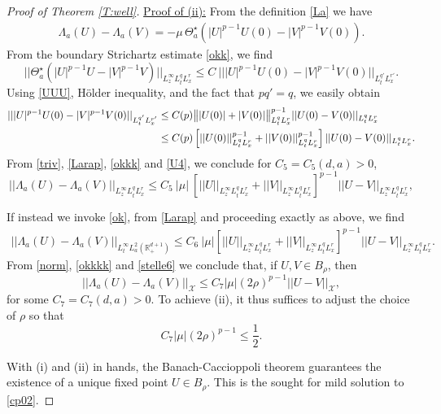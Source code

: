 \documentclass[11pt,letter]{amsart}
\def \RN {\mathbb{R}_+^{d+1}}
\numberwithin{equation}{section}
\newcommand{\Xs}{\mathcal X}
\numberwithin{equation}{section}
\begin{document}
\begin{proof}[Proof of Theorem \ref{T:well}]
\vskip 0.2in

\noindent \underline{Proof of (ii):} From the definition \eqref{La} we have
\begin{align}\label{Larap}
\Lambda_a(U) - \Lambda_a(V) = -\mu\, \Theta_a^\star\left(|U|^{p-1} U(0) - |V|^{p-1} V(0)\right).
\end{align}
From the boundary Strichartz estimate \eqref{okk}, we find
\begin{equation}\label{okkk}
||\Theta_a^\star\left(|U|^{p-1} U - |V|^{p-1} V\right)||_{L^\infty_{z} L^q_t L^r_x } \le C\ |||U|^{p-1} U(0) - |V|^{p-1} V(0)||_{L^{q'}_t L^{r'}_x}.
\end{equation}
Using \eqref{UUU}, H\"older inequality, and the fact that $pq' = q$, we easily obtain
\begin{align}\label{U4}
 || |U|^{p-1} U(0) - |V|^{p-1} V(0)||_{L^{q'}_t L^{r'}_x} & \le  C(p) \big\||U(0)| + |V(0)|\big\|^{p-1}_{L^q_t L^{r}_x}  ||U(0)-V(0)||_{L^q_t L^{r}_x}
 \\
& \le C(p) \left[||U(0)||^{p-1}_{L^q_t L^{r}_x}  + ||V(0)||^{p-1}_{L^q_t L^{r}_x}\right]  ||U(0)-V(0)||_{L^q_t L^{r}_x}.
\notag
\end{align}
From \eqref{triv}, \eqref{Larap}, \eqref{okkk} and \eqref{U4}, we conclude for $C_5 = C_5(d,a)>0$,
\begin{equation}\label{okkkk}
||\Lambda_a(U) - \Lambda_a(V)||_{L^\infty_{z} L^q_t L^r_x } \le C_5\ |\mu|\ \left[||U||_{L^\infty_z L^{q}_t L^{r}_x } + ||V||_{L^\infty_z L^{q}_t L^{r}_x}\right]^{p-1} ||U-V||_{L^\infty_z L^{q}_t L^{r}_x},
\end{equation}

If instead we invoke \eqref{ok}, from \eqref{Larap} and proceeding exactly as above, we find
\begin{align}\label{stelle6}
||\Lambda_a(U) - \Lambda_a(V)||_{L^\infty_t L^2_a(\RN)} \le C_6\ |\mu| \left[||U||_{ L^\infty_z L^{q}_t L^{r}_x} + ||V||_{ L^\infty_z L^{q}_t L^{r}_x}\right]^{p-1} ||U-V||_{ L^\infty_z L^{q}_t L^{r}_x}. 
\end{align}
From \eqref{norm}, \eqref{okkkk} and \eqref{stelle6} we conclude that, if $U, V\in B_\rho$, then
\[
||\Lambda_a(U) - \Lambda_a(V)||_{\Xs} \le C_7 |\mu| (2\rho)^{p-1} ||U - V||_{\Xs},
\]
for some $C_7 = C_7(d,a)>0$.
To achieve (ii), it thus suffices to adjust the choice of $\rho$ so that
\[
C_7 |\mu| (2\rho)^{p-1}\le \frac 12.
\]


With (i) and (ii) in hands, the Banach-Caccioppoli theorem guarantees the existence of a unique fixed point $U\in B_\rho$. This is the sought for mild solution to \eqref{cp02}.


\end{proof}
\end{document}
